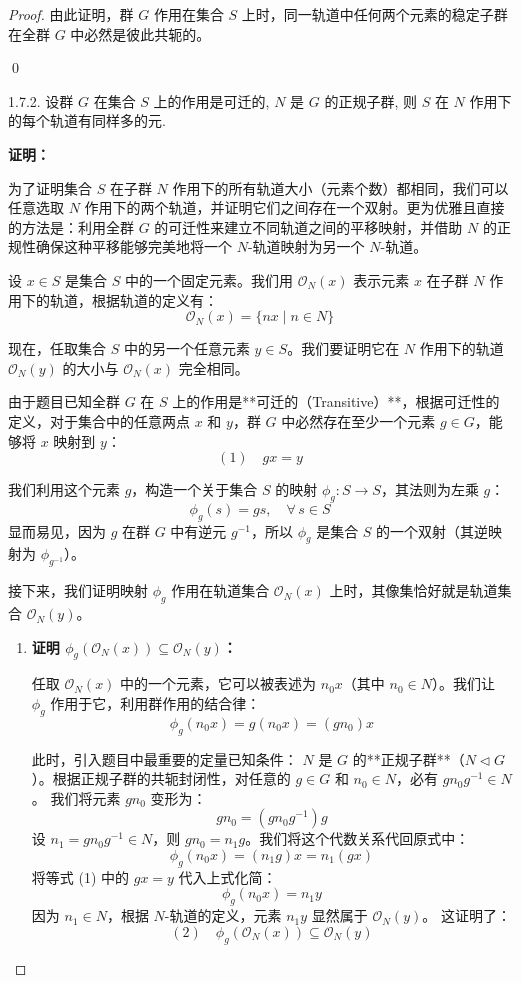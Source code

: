\documentclass[]{article}
\begin{document}
\begin{proof}
由此证明，群 $G$ 作用在集合 $S$ 上时，同一轨道中任何两个元素的稳定子群在全群 $G$ 中必然是彼此共轭的。

\qed

1.7.2. 设群 $G$ 在集合 $S$ 上的作用是可迁的, $N$ 是 $G$ 的正规子群, 则 $S$ 在 $N$ 作用下的每个轨道有同样多的元. 

\bigskip
\noindent \textbf{证明：} 

为了证明集合 $S$ 在子群 $N$ 作用下的所有轨道大小（元素个数）都相同，我们可以任意选取 $N$ 作用下的两个轨道，并证明它们之间存在一个双射。更为优雅且直接的方法是：利用全群 $G$ 的可迁性来建立不同轨道之间的平移映射，并借助 $N$ 的正规性确保这种平移能够完美地将一个 $N$-轨道映射为另一个 $N$-轨道。

\bigskip
设 $x \in S$ 是集合 $S$ 中的一个固定元素。我们用 $\mathcal{O}_N(x)$ 表示元素 $x$ 在子群 $N$ 作用下的轨道，根据轨道的定义有：
\[ \mathcal{O}_N(x) = \{ n x \mid n \in N \} \]

现在，任取集合 $S$ 中的另一个任意元素 $y \in S$。我们要证明它在 $N$ 作用下的轨道 $\mathcal{O}_N(y)$ 的大小与 $\mathcal{O}_N(x)$ 完全相同。

由于题目已知全群 $G$ 在 $S$ 上的作用是**可迁的（Transitive）**，根据可迁性的定义，对于集合中的任意两点 $x$ 和 $y$，群 $G$ 中必然存在至少一个元素 $g \in G$，能够将 $x$ 映射到 $y$：
\[ (1) \quad g x = y \]

我们利用这个元素 $g$，构造一个关于集合 $S$ 的映射 $\phi_g: S \to S$，其法则为左乘 $g$：
\[ \phi_g(s) = g s, \quad \forall \, s \in S \]
显而易见，因为 $g$ 在群 $G$ 中有逆元 $g^{-1}$，所以 $\phi_g$ 是集合 $S$ 的一个双射（其逆映射为 $\phi_{g^{-1}}$）。

接下来，我们证明映射 $\phi_g$ 作用在轨道集合 $\mathcal{O}_N(x)$ 上时，其像集恰好就是轨道集合 $\mathcal{O}_N(y)$。

\begin{enumerate}
	\item \textbf{证明 $\phi_g(\mathcal{O}_N(x)) \subseteq \mathcal{O}_N(y)$：}
	
	任取 $\mathcal{O}_N(x)$ 中的一个元素，它可以被表述为 $n_0 x$（其中 $n_0 \in N$）。我们让 $\phi_g$ 作用于它，利用群作用的结合律：
	\[ \phi_g(n_0 x) = g (n_0 x) = (g n_0) x \]
	
	此时，引入题目中最重要的定量已知条件： $N$ 是 $G$ 的**正规子群**（$N \triangleleft G$）。根据正规子群的共轭封闭性，对任意的 $g \in G$ 和 $n_0 \in N$，必有 $g n_0 g^{-1} \in N$。
	我们将元素 $g n_0$ 变形为：
	\[ g n_0 = (g n_0 g^{-1}) g \]
	设 $n_1 = g n_0 g^{-1} \in N$，则 $g n_0 = n_1 g$。我们将这个代数关系代回原式中：
	\[ \phi_g(n_0 x) = (n_1 g) x = n_1 (g x) \]
	将等式 (1) 中的 $gx = y$ 代入上式化简：
	\[ \phi_g(n_0 x) = n_1 y \]
	因为 $n_1 \in N$，根据 $N$-轨道的定义，元素 $n_1 y$ 显然属于 $\mathcal{O}_N(y)$。
	这证明了：
	\[ (2) \quad \phi_g(\mathcal{O}_N(x)) \subseteq \mathcal{O}_N(y) \]
	

\end{enumerate}
\end{proof}
\end{document}
